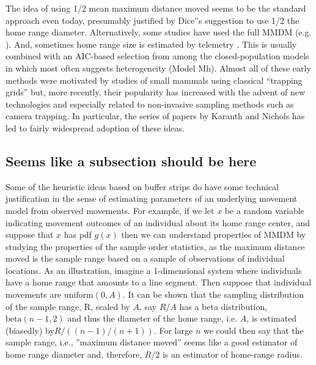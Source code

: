 The idea of using 1/2 mean maximum distance moved
\citep{wilson_anderson:1985a} seems to be the standard approach even
today, presumably justified by Dice''s suggestion to use 1/2 the home
range diameter. Alternatively, some studies have used the full MMDM
(e.g. \citet{parmenter_etal:2003}). And, sometimes home range size is
estimated by telemetry \citep{karanth:1995}. This is usually combined
with an AIC-based selection from among the closed-population models in
\citet{otis_etal:1978} which most often suggests heterogeneity (Model
Mh).  Almost all of these early methods were motivated by studies of
small mammals using classical ``trapping grids'' but, more recently,
their popularity has increased with the advent of new technologies and
especially related to non-invasive sampling methods such as camera
trapping. In particular, the series of papers by Karanth and Nichols
\citep{karanth:1995, karanth_nichols:1998, karanth_nichols:2002} 
has led to fairly widespread adoption of these ideas.

\subsection{Seems like a subsection should be here}

Some of the heuristic ideas based on buffer strips do have some
technical justification in the sense of estimating parameters of an
underlying movement model from observed movements. For example, if we
let $x$ be a random variable indicating movement outcomes of an
individual about its  home range center, and suppose that $x$ has pdf
$g(x)$ then we can understand properties of MMDM by studying the
properties of the sample order statistics, as the maximum distance
moved is the sample range based on a sample of observations of
individual locations. As an illustration, imagine a 1-dimensional
system where individuals have a home range that amounts to a line
segment. Then suppose that individual movements are $\mbox{uniform}(0,A)$. It
can be shown that the sampling distribution of the sample range, R,
scaled by $A$, say $R/A$ has a beta distribution, $\mbox{beta}(n-1,2)$ 
\citep[][p. 235]{casella_berger:2002}
and thus the diameter of the home range, i.e. $A$, is
estimated (biasedly) by$ R/( (n-1)/(n+1) )$. For large $n$ we could then
say that the sample range, i.e., ''maximum distance moved'' seems like a good estimator of home range diameter and, therefore, $R/2$ is an estimator of home-range radius.  

